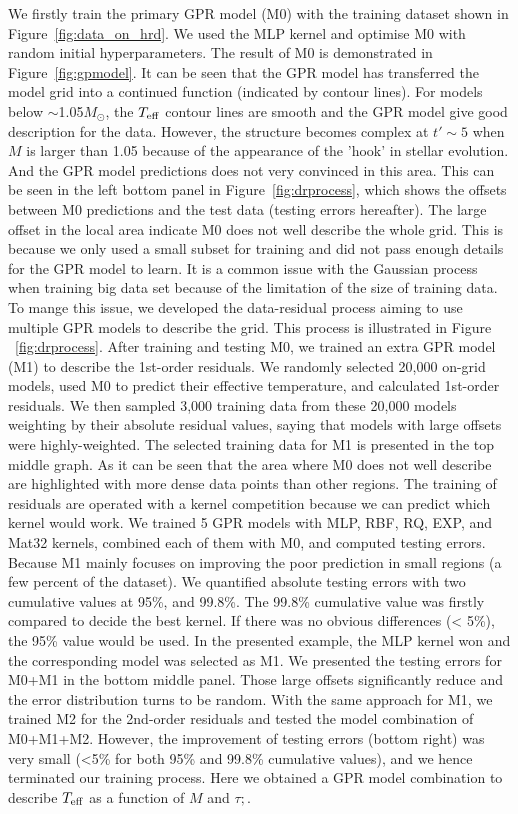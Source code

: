 We firstly train the primary GPR model (M0) with the training dataset shown in Figure~\ref{fig:data_on_hrd}. We used the MLP kernel and optimise M0 with random initial hyperparameters. The result of M0 is demonstrated in Figure~\ref{fig:gpmodel}. It can be seen that the GPR model has transferred the model grid into a continued function (indicated by contour lines). For models below $\sim$1.05$M_{\odot}$, the $T_{\rm eff}$ contour lines are smooth and the GPR model give good description for the data. However, the structure becomes complex at $t'\sim5$ when $M$ is larger than 1.05 because of the appearance of the 'hook' in stellar evolution. And the GPR model predictions does not very convinced in this area. This can be seen in the left bottom panel in Figure~\ref{fig:drprocess}, which shows the offsets between M0 predictions and the test data (testing errors hereafter). The large offset in the local area indicate M0 does not well describe the whole grid. This is because we only used a small subset for training and did not pass enough details for the GPR model to learn. It is a common issue with the Gaussian process when training big data set because of the limitation of the size of training data. To mange this issue, we developed the data-residual process aiming to use multiple GPR models to describe the grid. This process is illustrated in Figure ~\ref{fig:drprocess}. After training and testing M0, we trained an extra GPR model (M1) to describe the 1st-order residuals. We randomly selected 20,000 on-grid models, used M0 to predict their effective temperature, and calculated 1st-order residuals. We then sampled 3,000 training data from these 20,000 models weighting by their absolute residual values, saying that models with large offsets were highly-weighted. The selected training data for M1 is presented in the top middle graph. As it can be seen that the area where M0 does not well describe are highlighted with more dense data points than other regions. The training of residuals are operated with a kernel competition because we can predict which kernel would work. We trained 5 GPR models with MLP, RBF, RQ, EXP, and Mat32 kernels, combined each of them with M0, and computed testing errors. Because M1 mainly focuses on improving the poor prediction in small regions (a few percent of the dataset). We quantified absolute testing errors with two cumulative values at 95\%, and 99.8\%.  The 99.8\% cumulative value was firstly compared to decide the best kernel. If there was no obvious differences (< 5\%),  the 95\% value would be used. In the presented example, the MLP kernel won and the corresponding model was selected as M1. We presented the testing errors for M0+M1 in the bottom middle panel. Those large offsets significantly reduce and the error distribution turns to be random. With the same approach for M1, we trained M2 for the 2nd-order residuals and tested the model combination of M0+M1+M2. However, the improvement of testing errors (bottom right) was very small (<5\% for both 95\% and 99.8\% cumulative values), and we hence terminated our training process. Here we obtained a GPR model combination to describe $T_{\rm eff}$ as a function of $M$ and $\tau;$. 
%

